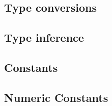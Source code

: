 \subsection{Type conversions}





\subsection{Type inference}




\subsection{Constants}




\subsection{Numeric Constants}




